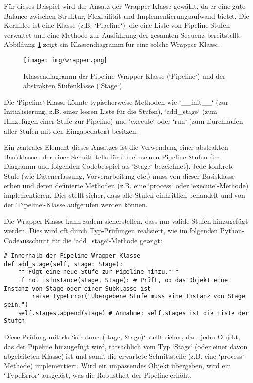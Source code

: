 \documentclass[a4paper]{article} %
\begin{document}
Für dieses Beispiel wird der Ansatz der Wrapper-Klasse gewählt, da er eine gute Balance zwischen Struktur, Flexibilität und Implementierungsaufwand bietet. Die Kernidee ist eine Klasse (z.B. `Pipeline`), die eine Liste von Pipeline-Stufen verwaltet und eine Methode zur Ausführung der gesamten Sequenz bereitstellt. Abbildung \ref{fig:wrapper} zeigt ein Klassendiagramm für eine solche Wrapper-Klasse.

\begin{figure}[htbp]
    \centering
    \texttt{[image: img/wrapper.png]}
    \caption{Klassendiagramm der Pipeline Wrapper-Klasse (`Pipeline`) und der abstrakten Stufenklasse (`Stage`).}
    \label{fig:wrapper}
\end{figure}

Die `Pipeline`-Klasse könnte typischerweise Methoden wie `\_\_init\_\_` (zur Initialisierung, z.B. einer leeren Liste für die Stufen), `add\_stage` (zum Hinzufügen einer Stufe zur Pipeline) und `execute` oder `run` (zum Durchlaufen aller Stufen mit den Eingabedaten) besitzen.

Ein zentrales Element dieses Ansatzes ist die Verwendung einer abstrakten Basisklasse oder einer Schnittstelle für die einzelnen Pipeline-Stufen (im Diagramm und folgenden Codebeispiel als `Stage` bezeichnet). Jede konkrete Stufe (wie Datenerfassung, Vorverarbeitung etc.) muss von dieser Basisklasse erben und deren definierte Methoden (z.B. eine `process` oder `execute`-Methode) implementieren. Dies stellt sicher, dass alle Stufen einheitlich behandelt und von der `Pipeline`-Klasse aufgerufen werden können.

Die Wrapper-Klasse kann zudem sicherstellen, dass nur valide Stufen hinzugefügt werden. Dies wird oft durch Typ-Prüfungen realisiert, wie im folgenden Python-Codeausschnitt für die `add\_stage`-Methode gezeigt:

\begin{verbatim}
# Innerhalb der Pipeline-Wrapper-Klasse
def add_stage(self, stage: Stage):
    """Fügt eine neue Stufe zur Pipeline hinzu."""
    if not isinstance(stage, Stage): # Prüft, ob das Objekt eine Instanz von Stage oder einer Subklasse ist
        raise TypeError("Übergebene Stufe muss eine Instanz von Stage sein.")
    self.stages.append(stage) # Annahme: self.stages ist die Liste der Stufen
\end{verbatim}

Diese Prüfung mittels `isinstance(stage, Stage)` stellt sicher, dass jedes Objekt, das der Pipeline hinzugefügt wird, tatsächlich vom Typ `Stage` (oder einer davon abgeleiteten Klasse) ist und somit die erwartete Schnittstelle (z.B. eine `process`-Methode) implementiert. Wird ein unpassendes Objekt übergeben, wird ein `TypeError` ausgelöst, was die Robustheit der Pipeline erhöht.
\end{document}
